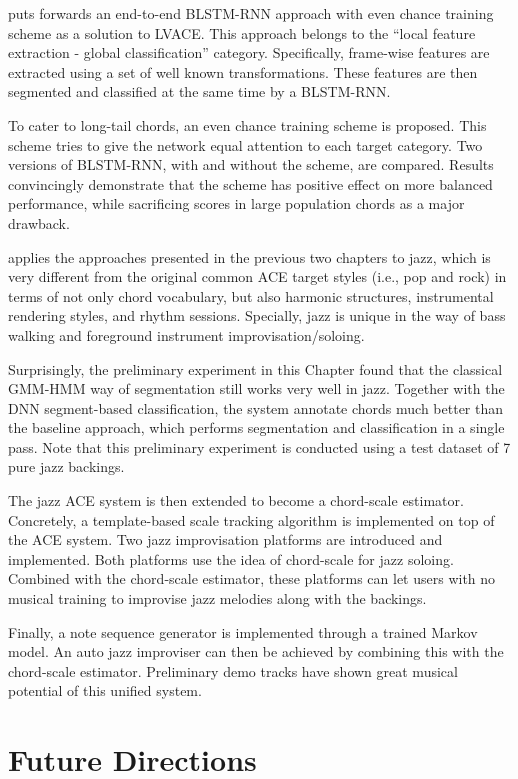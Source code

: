  puts forwards an end-to-end BLSTM-RNN approach with even chance training scheme as a solution to LVACE. This approach belongs to the ``local feature extraction - global classification'' category. Specifically, frame-wise features are extracted using a set of well known transformations. These features are then segmented and classified at the same time by a BLSTM-RNN.

To cater to long-tail chords, an even chance training scheme is proposed. This scheme tries to give the network equal attention to each target category. Two versions of BLSTM-RNN, with and without the scheme, are compared. Results convincingly demonstrate that the scheme has positive effect on more balanced performance, while sacrificing scores in large population chords as a major drawback.

 applies the approaches presented in the previous two chapters to jazz, which is very different from the original common ACE target styles (i.e., pop and rock) in terms of not only chord vocabulary, but also harmonic structures, instrumental rendering styles, and rhythm sessions. Specially, jazz is unique in the way of bass walking and foreground instrument improvisation/soloing.

Surprisingly, the preliminary experiment in this Chapter found that the classical GMM-HMM way of segmentation still works very well in jazz. Together with the DNN segment-based classification, the system annotate chords much better than the baseline approach, which performs segmentation and classification in a single pass. Note that this preliminary experiment is conducted using a test dataset of 7 pure jazz backings.

The jazz ACE system is then extended to become a chord-scale estimator. Concretely, a template-based scale tracking algorithm is implemented on top of the ACE system. Two jazz improvisation platforms are introduced and implemented. Both platforms use the idea of chord-scale for jazz soloing. Combined with the chord-scale estimator, these platforms can let users with no musical training to improvise jazz melodies along with the backings.

Finally, a note sequence generator is implemented through a trained Markov model. An auto jazz improviser can then be achieved by combining this with the chord-scale estimator. Preliminary demo tracks have shown great musical potential of this unified system.

\section{Future Directions} \label{sec:6-future}

